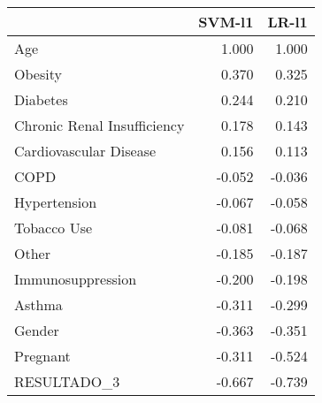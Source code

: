 \begin{tabular}{lrr}
\toprule
{} &  SVM-l1 &  LR-l1 \\
\midrule
Age                         &   1.000 &  1.000 \\
Obesity                     &   0.370 &  0.325 \\
Diabetes                    &   0.244 &  0.210 \\
Chronic Renal Insufficiency &   0.178 &  0.143 \\
Cardiovascular Disease      &   0.156 &  0.113 \\
COPD                        &  -0.052 & -0.036 \\
Hypertension                &  -0.067 & -0.058 \\
Tobacco Use                 &  -0.081 & -0.068 \\
Other                       &  -0.185 & -0.187 \\
Immunosuppression           &  -0.200 & -0.198 \\
Asthma                      &  -0.311 & -0.299 \\
Gender                      &  -0.363 & -0.351 \\
Pregnant                    &  -0.311 & -0.524 \\
RESULTADO\_3                 &  -0.667 & -0.739 \\
\bottomrule
\end{tabular}
